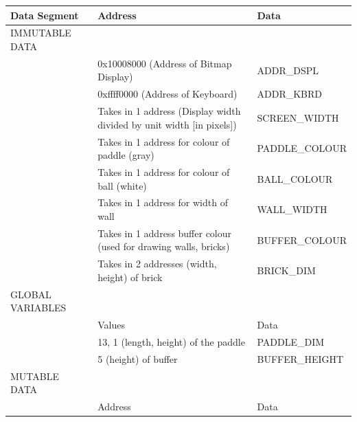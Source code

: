 \documentclass{article}
\begin{document}
\begin{enumerate}
\begin{table}[]
\begin{tabular}{|l|l|l|}
\hline
Data Segment     & Address                                                           & Data           \\ \hline
IMMUTABLE DATA   &                                                                   &                \\ \hline
                 & 0x10008000 (Address of Bitmap Display)                            & ADDR\_DSPL    \\ \hline
                 & 0xffff0000 (Address of Keyboard)                                  & ADDR\_KBRD     \\ \hline
                 & Takes in 1 address (Display width divided by unit width [in pixels])           & SCREEN\_WIDTH  \\ \hline
                 & Takes in 1 address for colour of paddle (gray)                                 & PADDLE\_COLOUR \\ \hline
                 & Takes in 1 address for colour of ball (white)                                  & BALL\_COLOUR   \\ \hline
                 & Takes in 1 address for width of wall                                           & WALL\_WIDTH    \\ \hline
                 & Takes in 1 address buffer colour (used for drawing walls, bricks)              & BUFFER\_COLOUR \\ \hline
                 & Takes in 2 addresses (width, height) of brick                                  & BRICK\_DIM     \\ \hline
GLOBAL VARIABLES &                                                                                &                \\ \hline
                 & Values                                                                         & Data           \\ \hline
                 & 13, 1 (length, height) of the paddle                                           & PADDLE\_DIM    \\ \hline
                 & 5 (height) of buffer                                                           & BUFFER\_HEIGHT \\ \hline
MUTABLE DATA     &                                                                   &                \\ \hline
                 & Address                                                           & Data           \\ \hline

\end{tabular}
\end{table}
\end{enumerate}
\end{document}
